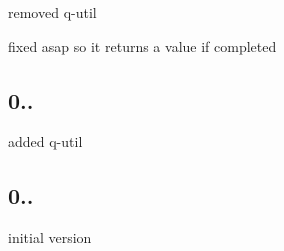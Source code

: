 \begin{DoxyItemize}
\item removed q-\/util
\item fixed asap so it returns a value if completed
\end{DoxyItemize}

\subsection*{0..}


\begin{DoxyItemize}
\item added q-\/util
\end{DoxyItemize}

\subsection*{0..}


\begin{DoxyItemize}
\item initial version 
\end{DoxyItemize}